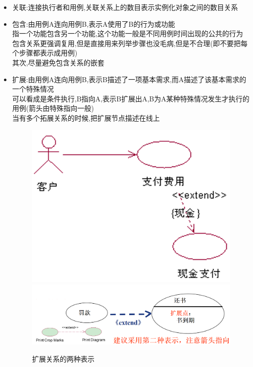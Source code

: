\documentclass[UTF8,a4paper]{ctexart}
\newcommand{\spaceline}{\vspace{\baselineskip}}
\begin{document}
\begin{itemize}
  \item 关联:连接执行者和用例,关联关系上的数目表示实例化对象之间的数目关系
  \item 包含:由用例A连向用例B,表示A使用了B的行为或功能\\
  指一个功能包含另一个功能,这个功能一般是不同用例时间出现的公共的行为\\
  包含关系更强调复用,但是直接用来列举步骤也没毛病,但是不合理(即不要把每个步骤都表示成用例)\\
  其次,尽量避免包含关系的嵌套
  \item 扩展:由用例A连向用例B,表示B描述了一项基本需求,而A描述了该基本需求的一个特殊情况\\
  可以看成是条件执行,B指向A,表示B扩展出A,B为A某种特殊情况发生才执行的用例(箭头由特殊指向一般)\\
  当有多个拓展关系的时候,把扩展节点描述在线上
  \begin{figure}[H]
    \centering
    \includegraphics[scale = 0.3]{assets/SoftwareEngineering_5d2ad.png}
    \includegraphics[scale = 0.3]{assets/SoftwareEngineering_0b9db.png}
    \caption{扩展关系的两种表示}
   \end{figure}
\end{itemize}
\spaceline
\end{document}
